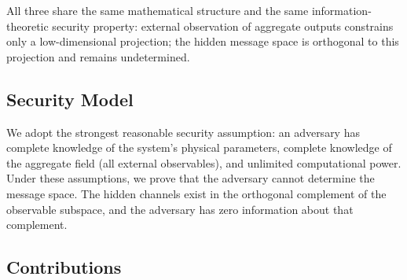 \documentclass[11pt,twocolumn,a4paper]{article}
\theoremstyle{definition}
\begin{document}
All three share the same mathematical structure and the same information-theoretic security property: external observation of aggregate outputs constrains only a low-dimensional projection; the hidden message space is orthogonal to this projection and remains undetermined.

\subsection{Security Model}

We adopt the strongest reasonable security assumption: an adversary has complete knowledge of the system's physical parameters, complete knowledge of the aggregate field (all external observables), and unlimited computational power. Under these assumptions, we prove that the adversary cannot determine the message space. The hidden channels exist in the orthogonal complement of the observable subspace, and the adversary has zero information about that complement.

\subsection{Contributions}
\end{document}
